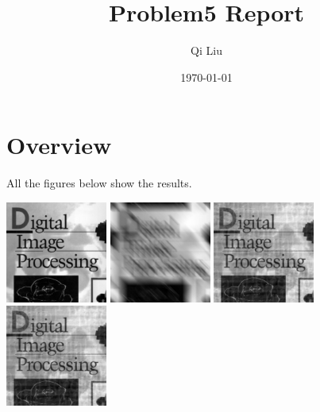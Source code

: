 \documentclass{article}
\title{Problem5 Report}
\author{Qi Liu}
\date{\today}
\begin{document}
\maketitle

\section{Overview}
All the figures below show the results.

\includegraphics[width=0.25\textwidth]{../data/book_cover.jpg}
\includegraphics[width=0.25\textwidth]{../data/blur_0_book_cover.jpg}
\includegraphics[width=0.25\textwidth]{../data/inverse_0_book_cover.jpg}
\includegraphics[width=0.25\textwidth]{../data/wiener_deconvolution_0_book_cover.jpg}
\end{document}
